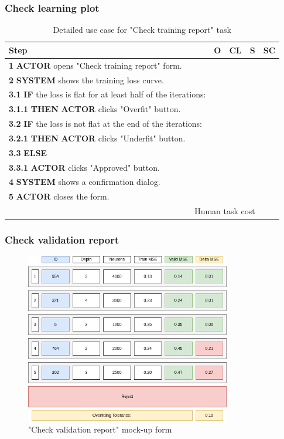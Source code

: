 \subsubsection{Check learning plot}

\begin{table}[H]
\centering
\begin{tabularx}{\textwidth}{|X|c|c|c|c|}
\hline
\textbf{Step} & \textbf{O} & \textbf{CL} & \textbf{S} & \textbf{SC} \\
\hline
\textbf{1} \textbf{ACTOR} opens "Check training report" form. & & & & \\
\hline
\textbf{2} \textbf{SYSTEM} shows the training loss curve. & & & & \\
\hline
\textbf{3.1} \textbf{IF} the loss is flat for at least half of the iterations: & & & & \\
\hline
\textbf{3.1.1} \textbf{THEN} \textbf{ACTOR} clicks "Overfit" button. & & & & \\
\hline
\textbf{3.2} \textbf{IF} the loss is not flat at the end of the iterations: & & & & \\
\hline
\textbf{3.2.1} \textbf{THEN} \textbf{ACTOR} clicks "Underfit" button. & & & & \\
\hline
\textbf{3.3} \textbf{ELSE} & & & & \\
\hline
\textbf{3.3.1} \textbf{ACTOR} clicks "Approved" button. & & & & \\
\hline
\textbf{4} \textbf{SYSTEM} shows a confirmation dialog. & & & & \\
\hline
\textbf{5} \textbf{ACTOR} closes the form. & & & & \\
\hline
\multicolumn{4}{|r|}{Human task cost} & \\
\hline
\end{tabularx}
\caption{Detailed use case for "Check training report" task}
\label{table:check_training_report}
\end{table}

\subsubsection{Check validation report}

\begin{figure}[H]
\centering
\includegraphics[width=0.8\textwidth]{figures/check_validation_report.png}
\caption{"Check validation report" mock-up form}
\end{figure}

